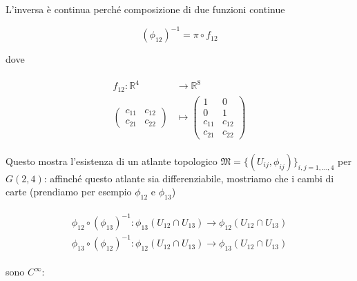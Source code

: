 L'inversa è continua perché composizione di due funzioni continue

\begin{equation}
	(\phi_{12})^{-1} = \pi \circ f_{12}
\end{equation}

dove

\begin{align}
	\begin{split}
		f_{12} : \mathbb{R}^{4} &\to \mathbb{R}^{8}\\
		\begin{pmatrix} c_{11} & c_{12} \\ c_{21} & c_{22} \end{pmatrix} &\mapsto \begin{pmatrix} 1 & 0 \\ 0 & 1 \\ c_{11} & c_{12} \\ c_{21} & c_{22} \end{pmatrix}
	\end{split}
\end{align}

Questo mostra l'esistenza di un atlante topologico $ \mathfrak{M} = \{(U_{ij},\phi_{ij})\}_{i,j=1,\dots,4} $ per $ G(2,4) $: affinché questo atlante sia differenziabile, mostriamo che i cambi di carte (prendiamo per esempio $ \phi_{12} $ e $ \phi_{13} $)

\begin{align}
	\begin{split}
		\phi_{12} \circ (\phi_{13})^{-1} : \phi_{13} (U_{12} \cap U_{13}) \to \phi_{12} (U_{12} \cap U_{13})\\
		\phi_{13} \circ (\phi_{12})^{-1} : \phi_{12} (U_{12} \cap U_{13}) \to \phi_{13} (U_{12} \cap U_{13})
	\end{split}
\end{align}

sono $ C^{\infty} $:


